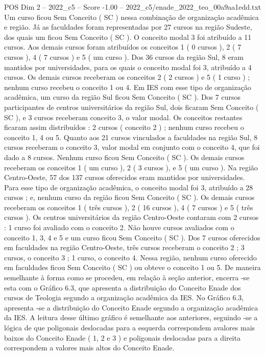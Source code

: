 \begin{textsample}{POS Dim 2 – 2022\_c5 – Score -1.00 – 2022\_c5/enade\_2022\_teo\_00a9aa1edd.txt}
Um curso ficou Sem Conceito ( SC ) nessa combinação de organização acadêmica e região.
Já as faculdades foram representadas por 27 cursos na região Sudeste, dos quais um ficou Sem Conceito ( SC ).
O conceito modal 3 foi atribuído a 11 cursos.
Aos demais cursos foram atribuídos os conceitos 1 ( 0 cursos ), 2 ( 7 cursos ), 4 ( 7 cursos ) e 5 ( um curso ).
Dos 36 cursos da região Sul, 8 eram mantidos por universidades, para os quais o conceito modal foi 3, atribuído a 4 cursos.
Os demais cursos receberam os conceitos 2 ( 2 cursos ) e 5 ( 1 curso ) ; nenhum curso recebeu o conceito 1 ou 4.
Em IES com esse tipo de organização acadêmica, um curso da região Sul ficou Sem Conceito ( SC ).
Dos 7 cursos participantes de centros universitários da região Sul, dois ficaram Sem Conceito ( SC ), e 3 cursos receberam conceito 3, o valor modal.
Os conceitos restantes ficaram assim distribuídos : 2 cursos ( conceito 2 ) ; nenhum curso recebeu o conceito 1, 4 ou 5.
Quanto aos 21 cursos vinculados a faculdades na região Sul, 8 cursos receberam o conceito 3, valor modal em conjunto com o conceito 4, que foi dado a 8 cursos.
Nenhum curso ficou Sem Conceito ( SC ).
Os demais cursos receberam os conceitos 1 ( um curso ), 2 ( 3 cursos ), e 5 ( um curso ).
Na região Centro-Oeste, 57 dos 137 cursos oferecidos eram mantidos por universidades.
Para esse tipo de organização acadêmica, o conceito modal foi 3, atribuído a 28 cursos ; e, nenhum curso da região ficou Sem Conceito ( SC ).
Os demais cursos receberam os conceitos 1 ( três cursos ), 2 ( 16 cursos ), 4 ( 7 cursos ) e 5 ( três cursos ).
Os centros universitários da região Centro-Oeste contaram com 2 cursos : 1 curso foi avaliado com o conceito 2.
Não houve cursos avaliados com o conceito 1, 3, 4 e 5 e um curso ficou Sem Conceito ( SC ).
Dos 7 cursos oferecidos em faculdades na região Centro-Oeste, três cursos receberam o conceito 2 ; 3 cursos, o conceito 3 ; 1 curso, o conceito 4.
Nessa região, nenhum curso oferecido em faculdades ficou Sem Conceito ( SC ) ou obteve o conceito 1 ou 5.
De maneira semelhante à forma como se procedeu, em relação à seção anterior, encerra -se esta com o Gráfico 6.3, que apresenta a distribuição do Conceito Enade dos cursos de Teologia segundo a organização acadêmica da IES.
No Gráfico 6.3, apresenta -se a distribuição do Conceito Enade segundo a organização acadêmica da IES.
A leitura desse último gráfico é semelhante aos anteriores, seguindo -se a lógica de que poligonais deslocadas para a esquerda correspondem avalores mais baixos do Conceito Enade ( 1, 2 e 3 ) e poligonais deslocadas para a direita correspondem a valores mais altos do Conceito Enade.

\end{textsample}
